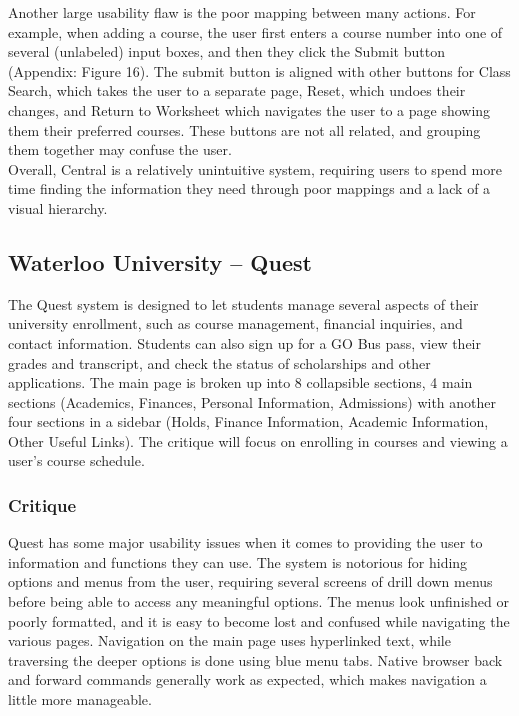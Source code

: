 \documentclass[10pt]{article}
\begin{document}
\begin{multicols}{2}
Another large usability flaw is the poor mapping between many actions. For 
example, when adding a course, the user first enters a course number into one of 
several (unlabeled) input boxes, and then they click the Submit button (Appendix: 
Figure 16). The submit button is aligned with other buttons for Class Search, 
which takes the user to a separate page, Reset, which undoes their changes, and 
Return to Worksheet which navigates the user to a page showing them their 
preferred courses. These buttons are not all related, and grouping them together 
may confuse the user.\\

Overall, Central is a relatively unintuitive system, requiring users to spend 
more time finding the information they need through poor mappings and a lack of 
a visual hierarchy.

\subsection*{Waterloo University -- Quest}
The Quest system is designed to let students manage several aspects 
of their university enrollment, such as course management, financial inquiries, 
and contact information. Students can also sign up for a GO Bus pass, view their 
grades and transcript, and check the status of scholarships and other 
applications. The main page is broken up into 8 collapsible sections, 4 main 
sections (Academics, Finances, Personal Information, Admissions) with another four 
sections in a sidebar (Holds, Finance Information, Academic Information, Other 
Useful Links). The critique will focus on enrolling in courses and viewing a 
user's course schedule.

\subsubsection*{Critique}
Quest has some major usability issues when it comes to providing the user to 
information and functions they can use. The system is notorious for hiding 
options and menus from the user, requiring several screens of drill down menus 
before being able to access any meaningful options. The menus look unfinished or 
poorly formatted, and it is easy to become lost and confused while navigating 
the various pages. Navigation on the main page uses hyperlinked text, 
while traversing the deeper options is done using blue menu tabs. Native browser 
back and forward commands generally work as expected, which makes navigation a 
little more manageable. 


\end{multicols}
\end{document}
